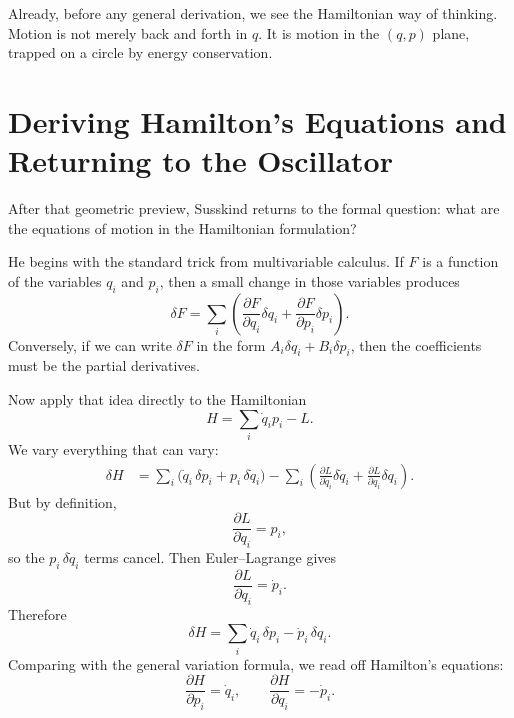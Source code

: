 Already, before any general derivation, we see the Hamiltonian way of thinking. Motion is not merely back and forth in \(q\). It is motion in the \((q,p)\) plane, trapped on a circle by energy conservation.

\section{Deriving Hamilton's Equations and Returning to the Oscillator}

After that geometric preview, Susskind returns to the formal question: what are the equations of motion in the Hamiltonian formulation?

He begins with the standard trick from multivariable calculus. If \(F\) is a function of the variables \(q_i\) and \(p_i\), then a small change in those variables produces
\begin{equation}
\delta F=\sum_i\left(\frac{\partial F}{\partial q_i}\delta q_i+\frac{\partial F}{\partial p_i}\delta p_i\right).
\end{equation}
Conversely, if we can write \(\delta F\) in the form \(A_i\delta q_i+B_i\delta p_i\), then the coefficients must be the partial derivatives.

Now apply that idea directly to the Hamiltonian
\begin{equation}
H=\sum_i \dot q_i p_i-L.
\end{equation}
We vary everything that can vary:
\begin{align}
\delta H
&=\sum_i\big(\dot q_i\,\delta p_i+p_i\,\delta\dot q_i\big)
-\sum_i\left(\frac{\partial L}{\partial \dot q_i}\delta\dot q_i+\frac{\partial L}{\partial q_i}\delta q_i\right).
\end{align}
But by definition,
\begin{equation}
\frac{\partial L}{\partial \dot q_i}=p_i,
\end{equation}
so the \(p_i\,\delta\dot q_i\) terms cancel. Then Euler--Lagrange gives
\begin{equation}
\frac{\partial L}{\partial q_i}=\dot p_i.
\end{equation}
Therefore
\begin{equation}
\delta H=\sum_i \dot q_i\,\delta p_i-\dot p_i\,\delta q_i.
\end{equation}
Comparing with the general variation formula, we read off Hamilton's equations:
\begin{equation}
\frac{\partial H}{\partial p_i}=\dot q_i,\qquad
\frac{\partial H}{\partial q_i}=-\dot p_i.
\end{equation}

